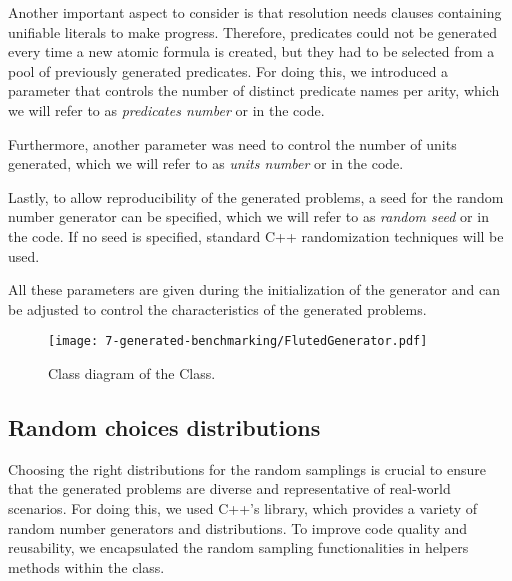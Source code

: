 Another important aspect to consider is that resolution needs clauses containing unifiable literals to make progress. Therefore, predicates could not be generated every time a new atomic formula is created, but they had to be selected from a pool of previously generated predicates.
For doing this, we introduced a parameter that controls the number of distinct predicate names per arity, which we will refer to as \emph{predicates number} or  in the code.

Furthermore, another parameter was need to control the number of units generated, which we will refer to as \emph{units number} or  in the code.

Lastly, to allow reproducibility of the generated problems, a seed for the random number generator can be specified, which we will refer to as \emph{random seed} or  in the code.
If no seed is specified, standard C++ randomization techniques will be used.

All these parameters are given during the initialization of the generator and can be adjusted to control the characteristics of the generated problems.

\begin{figure}[H]
  \centering
  \texttt{[image: 7-generated-benchmarking/FlutedGenerator.pdf]}
  \caption{Class diagram of the  Class.}\label{fig:fluted-generator-architecture}
\end{figure}

\subsection{Random choices distributions}\label{subsec:random-choices-distributions}

Choosing the right distributions for the random samplings is crucial to ensure that the generated problems are diverse and representative of real-world scenarios.
For doing this, we used C++'s  library, which provides a variety of random number generators and distributions.
To improve code quality and reusability, we encapsulated the random sampling functionalities in helpers methods within the  class.

